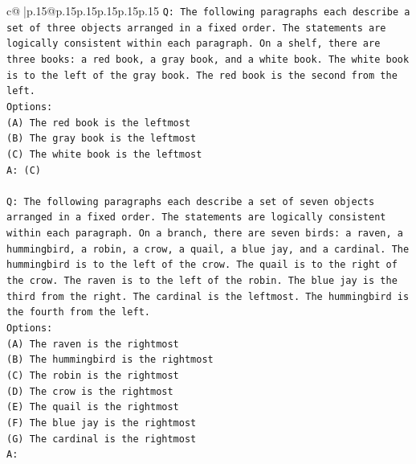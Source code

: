 \documentclass{article}
\begin{document}
{\begin{supertabular}{c@{$\;$}|p{.15\linewidth}@{}p{.15\linewidth}p{.15\linewidth}p{.15\linewidth}p{.15\linewidth}p{.15\linewidth}}
{{{\texttt{Q: The following paragraphs each describe a set of three objects arranged in a fixed order. The statements are logically consistent within each paragraph. On a shelf, there are three books: a red book, a gray book, and a white book. The white book is to the left of the gray book. The red book is the second from the left.} \\
\texttt{Options:} \\
\texttt{(A) The red book is the leftmost} \\
\texttt{(B) The gray book is the leftmost} \\
\texttt{(C) The white book is the leftmost} \\
\texttt{A: (C)} \\
\\ 
\texttt{Q: The following paragraphs each describe a set of seven objects arranged in a fixed order. The statements are logically consistent within each paragraph. On a branch, there are seven birds: a raven, a hummingbird, a robin, a crow, a quail, a blue jay, and a cardinal. The hummingbird is to the left of the crow. The quail is to the right of the crow. The raven is to the left of the robin. The blue jay is the third from the right. The cardinal is the leftmost. The hummingbird is the fourth from the left.} \\
\texttt{Options:} \\
\texttt{(A) The raven is the rightmost} \\
\texttt{(B) The hummingbird is the rightmost} \\
\texttt{(C) The robin is the rightmost} \\
\texttt{(D) The crow is the rightmost} \\
\texttt{(E) The quail is the rightmost} \\
\texttt{(F) The blue jay is the rightmost} \\
\texttt{(G) The cardinal is the rightmost} \\
\texttt{A:} \\
            }
        }
    }
     \\ \\


\end{supertabular}}
\end{document}
